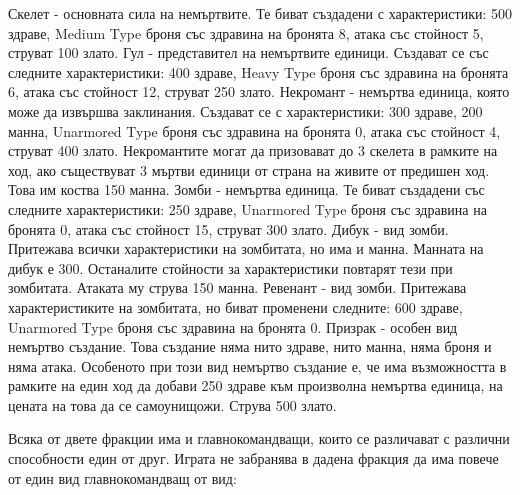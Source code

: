 Скелет -\/ основната сила на немъртвите. Те биват създадени с характеристики\+: 500 здраве, Medium Type броня със здравина на бронята 8, атака със стойност 5, струват 100 злато. Гул -\/ представител на немъртвите единици. Създават се със следните характеристики\+: 400 здраве, Heavy Type броня със здравина на бронята 6, атака със стойност 12, струват 250 злато. Некромант -\/ немъртва единица, която може да извършва заклинания. Създават се с характеристики\+: 300 здраве, 200 манна, Unarmored Type броня със здравина на бронята 0, атака със стойност 4, струват 400 злато. Некромантите могат да призовават до 3 скелета в рамките на ход, ако съществуват 3 мъртви единици от страна на живите от предишен ход. Това им коства 150 манна. Зомби -\/ немъртва единица. Те биват създадени със следните характеристики\+: 250 здраве, Unarmored Type броня със здравина на бронята 0, атака със стойност 15, струват 300 злато. Дибук -\/ вид зомби. Притежава всички характеристики на зомбитата, но има и манна. Манната на дибук е 300. Останалите стойности за характеристики повтарят тези при зомбитата. Атаката му струва 150 манна. Ревенант -\/ вид зомби. Притежава характеристиките на зомбитата, но биват променени следните\+: 600 здраве, Unarmored Type броня със здравина на бронята 0. Призрак -\/ особен вид немъртво създание. Това създание няма нито здраве, нито манна, няма броня и няма атака. Особеното при този вид немъртво създание е, че има възможността в рамките на един ход да добави 250 здраве към произволна немъртва единица, на цената на това да се самоунищожи. Струва 500 злато.

Всяка от двете фракции има и главнокомандващи, които се различават с различни способности един от друг. Играта не забранява в дадена фракция да има повече от един вид главнокомандващ от вид\+:

